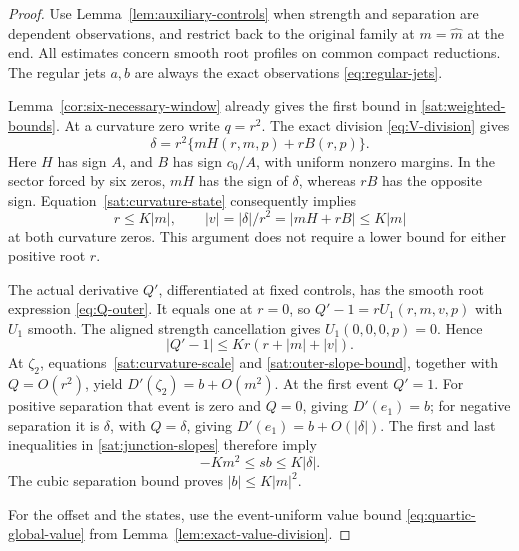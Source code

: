 \begin{proof}
Use Lemma~\ref{lem:auxiliary-controls} when strength and separation
are dependent observations, and restrict back to the original family
at \(m=\widehat m\) at the end. All estimates concern smooth root profiles on common
compact reductions. The regular jets \(a,b\) are always the exact
observations \eqref{eq:regular-jets}.

Lemma~\ref{cor:six-necessary-window} already gives the first
bound in \eqref{sat:weighted-bounds}. At a curvature zero write
\(q=r^2\). The exact division \eqref{eq:V-division} gives
\begin{equation}\label{sat:curvature-state}
 \delta=r^2\{mH(r,m,p)+rB(r,p)\}.
\end{equation}
Here \(H\) has sign \(A\), and \(B\) has sign \(c_0/A\),
with uniform nonzero margins. In the sector forced by six zeros,
\(mH\) has the sign of \(\delta\), whereas \(rB\) has the
opposite sign. Equation~\eqref{sat:curvature-state} consequently
implies
\begin{equation}\label{sat:curvature-scale}
 r\le K|m|,\qquad
 |v|=|\delta|/r^2=|mH+rB|\le K|m|
\end{equation}
at both curvature zeros. This argument does not require a lower
bound for either positive root \(r\).

The actual derivative \(Q'\), differentiated at fixed controls,
has the smooth root expression \eqref{eq:Q-outer}. It equals one
at \(r=0\), so \(Q'-1=rU_1(r,m,v,p)\) with \(U_1\) smooth.
The aligned strength cancellation gives \(U_1(0,0,0,p)=0\).
Hence
\begin{equation}\label{sat:outer-slope-bound}
 |Q'-1|\le K r(r+|m|+|v|).
\end{equation}
At \(\zeta_2\), equations~\eqref{sat:curvature-scale} and
\eqref{sat:outer-slope-bound}, together with \(Q=O(r^2)\), yield
\(D'(\zeta_2)=b+O(m^2)\). At the first event \(Q'=1\).
For positive separation that event is zero and \(Q=0\), giving
\(D'(e_1)=b\); for negative separation it is \(\delta\), with
\(Q=\delta\), giving \(D'(e_1)=b+O(|\delta|)\).
The first and last inequalities in \eqref{sat:junction-slopes}
therefore imply
\[
 -Km^2\le sb\le K|\delta|.
\]
The cubic separation bound proves \(|b|\le K|m|^2\).

For the offset and the states, use the event-uniform value bound
\eqref{eq:quartic-global-value} from Lemma~\ref{lem:exact-value-division}.


\end{proof}
